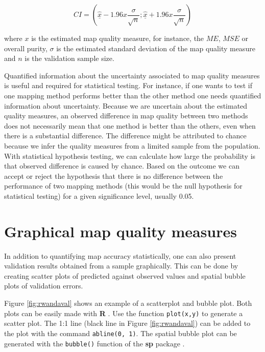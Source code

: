 \documentclass[10pt,b5paper,]{book}
\theoremstyle{definition}
\theoremstyle{definition}
\theoremstyle{definition}
\theoremstyle{remark}
\begin{document}
\begin{equation}
CI = (\underline{\hat{x}} - 1.96x \frac{\sigma}{\sqrt{n} } ; \underline{\hat{x}} + 1.96x \frac{\sigma}{\sqrt{n} })
\end{equation}

where \(x\) is the estimated map quality measure, for instance, the
\(ME\), \(MSE\) or overall purity, \(\sigma\) is the estimated standard
deviation of the map quality measure and \(n\) is the validation sample
size.

Quantified information about the uncertainty associated to map quality
measures is useful and required for statistical testing. For instance,
if one wants to test if one mapping method performs better than the
other method one needs quantified information about uncertainty. Because
we are uncertain about the estimated quality measures, an observed
difference in map quality between two methods does not necessarily mean
that one method is better than the others, even when there is a
substantial difference. The difference might be attributed to chance
because we infer the quality measures from a limited sample from the
population. With statistical hypothesis testing, we can calculate how
large the probability is that observed difference is caused by chance.
Based on the outcome we can accept or reject the hypothesis that there
is no difference between the performance of two mapping methods (this
would be the null hypothesis for statistical testing) for a given
significance level, usually 0.05.

\hypertarget{graphical-map-quality-measures}{%
\section{Graphical map quality
measures}\label{graphical-map-quality-measures}}

In addition to quantifying map accuracy statistically, one can also
present validation results obtained from a sample graphically. This can
be done by creating scatter plots of predicted against observed values
and spatial bubble plots of validation errors.

Figure \ref{fig:rwandaval} shows an example of a scatterplot and bubble
plot. Both plots can be easily made with \textbf{R} \citep{rcore}. Use
the function \texttt{plot(x,y)} to generate a scatter plot. The 1:1 line
(black line in Figure \ref{fig:rwandaval}) can be added to the plot with
the command \texttt{abline(0,\ 1)}. The spatial bubble plot can be
generated with the \texttt{bubble()} function of the \textbf{sp} package
\citep{pebesma2005classes}.
\end{document}
